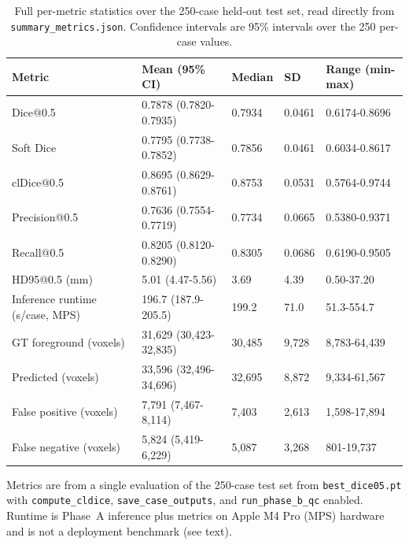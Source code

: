 \documentclass[anonymous]{iopjournal}
\begin{document}
\begin{table}[!htbp]
\centering
\caption{Full per-metric statistics over the 250-case held-out test set, read directly from \texttt{summary\_metrics.json}. Confidence intervals are 95\% intervals over the 250 per-case values.}
\label{tab:full-metrics}
\begin{threeparttable}
\footnotesize
\setlength{\tabcolsep}{5pt}
\begin{tabularx}{0.97\textwidth}{L{0.24\textwidth} l l l Y}
\toprule
\textbf{Metric} & \textbf{Mean (95\% CI)} & \textbf{Median} & \textbf{SD} & \textbf{Range (min-max)} \\
\midrule
Dice@0.5 & 0.7878 (0.7820-0.7935) & 0.7934 & 0.0461 & 0.6174-0.8696 \\
Soft Dice & 0.7795 (0.7738-0.7852) & 0.7856 & 0.0461 & 0.6034-0.8617 \\
clDice@0.5 & 0.8695 (0.8629-0.8761) & 0.8753 & 0.0531 & 0.5764-0.9744 \\
Precision@0.5 & 0.7636 (0.7554-0.7719) & 0.7734 & 0.0665 & 0.5380-0.9371 \\
Recall@0.5 & 0.8205 (0.8120-0.8290) & 0.8305 & 0.0686 & 0.6190-0.9505 \\
HD95@0.5 (mm) & 5.01 (4.47-5.56) & 3.69 & 4.39 & 0.50-37.20 \\
Inference runtime (s/case, MPS) & 196.7 (187.9-205.5) & 199.2 & 71.0 & 51.3-554.7 \\
\midrule
GT foreground (voxels) & 31,629 (30,423-32,835) & 30,485 & 9,728 & 8,783-64,439 \\
Predicted (voxels) & 33,596 (32,496-34,696) & 32,695 & 8,872 & 9,334-61,567 \\
False positive (voxels) & 7,791 (7,467-8,114) & 7,403 & 2,613 & 1,598-17,894 \\
False negative (voxels) & 5,824 (5,419-6,229) & 5,087 & 3,268 & 801-19,737 \\
\bottomrule
\end{tabularx}
\begin{tablenotes}\footnotesize
\item Metrics are from a single evaluation of the 250-case test set from \texttt{best\_dice05.pt} with \texttt{compute\_cldice}, \texttt{save\_case\_outputs}, and \texttt{run\_phase\_b\_qc} enabled. Runtime is Phase~A inference plus metrics on Apple M4 Pro (MPS) hardware and is not a deployment benchmark (see text).
\end{tablenotes}
\end{threeparttable}
\end{table}
\end{document}
